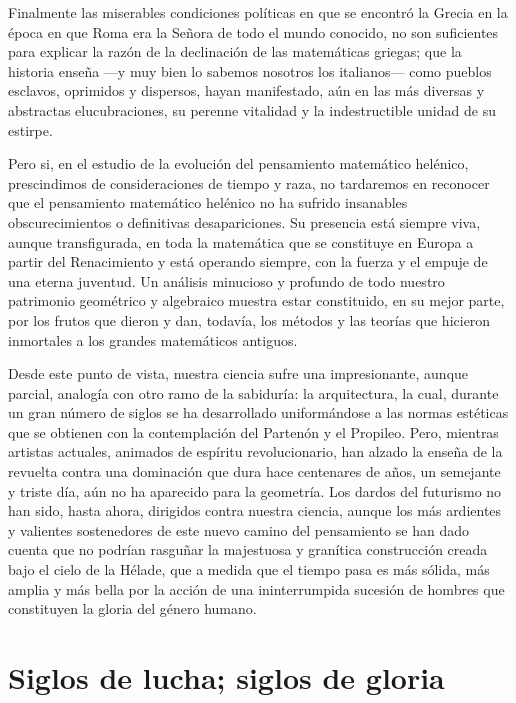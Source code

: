 \documentclass[a4paper, 12pt, draft]{article}
\begin{document}
{Finalmente las miserables condiciones políticas en que se encontró la Grecia en la época en que Roma era la Señora de todo el mundo conocido, no son suficientes para explicar la razón de la declinación de las matemáticas griegas; que la historia enseña ---y muy bien lo sabemos nosotros los italianos--- como pueblos esclavos, oprimidos y dispersos, hayan manifestado, aún en las más diversas y abstractas elucubraciones, su perenne vitalidad y la indestructible unidad de su estirpe.


Pero si, en el estudio de la evolución del pensamiento matemático helénico, prescindimos de consideraciones de tiempo y raza, no tardaremos en reconocer que el pensamiento matemático helénico no ha sufrido insanables obscurecimientos o definitivas desapariciones. Su presencia está siempre viva, aunque transfigurada, en toda la matemática que se constituye en Europa a partir del Renacimiento y está operando siempre, con la fuerza y el empuje de una eterna juventud. Un análisis minucioso y profundo de todo nuestro patrimonio geométrico y algebraico muestra estar constituido, en su mejor parte, por los frutos que dieron y dan, todavía, los métodos y las teorías que hicieron inmortales a los grandes matemáticos antiguos.

Desde este punto de vista, nuestra ciencia sufre una impresionante, aunque parcial, analogía con otro ramo de la sabiduría: la arquitectura, la cual, durante un gran número de siglos se ha desarrollado uniformándose a las normas estéticas que se obtienen con la contemplación del Partenón y el Propileo. Pero, mientras artistas actuales, animados de espíritu revolucionario, han alzado la enseña de la revuelta contra una dominación que dura hace centenares de años, un semejante y triste día, aún no ha aparecido para la geometría. Los dardos del futurismo no han sido, hasta ahora, dirigidos contra nuestra ciencia, aunque los más ardientes y valientes
sostenedores de este nuevo camino del pensamiento se han dado cuenta que no podrían rasguñar
la majestuosa y granítica construcción creada bajo el cielo de la Hélade, que a medida que el tiempo pasa es más sólida, más amplia y más bella por la acción de una ininterrumpida sucesión de hombres que constituyen la gloria del género humano.



\newpage



\section*{Siglos de lucha; siglos de gloria}

}
\end{document}
